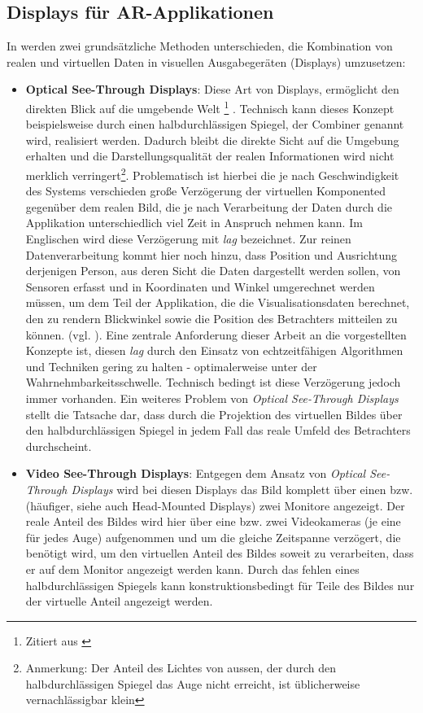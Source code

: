 \documentclass[a4paper,titlepage,12pt]{scrartcl}
\newtheorem[L]{boxedDefinition}{Definition}
\newcommand{\footnoteremember}[2]{
  \footnote{#2}
  \newcounter{#1}
  \setcounter{#1}{\value{footnote}}
}
\newcommand{\footnoterecall}[1]{
  \footnotemark[\value{#1}]
}
\begin{document}
\subsection{Displays für AR-Applikationen}
In \cite[Kapitel 2.2, Seite 21]{Toe2010} werden zwei grundsätzliche Methoden unterschieden, die Kombination von realen und virtuellen Daten in visuellen Ausgabegeräten (Displays) umzusetzen:
\begin{itemize}
 \item \textbf{Optical See-Through Displays}: Diese Art von Displays, ermöglicht den \glqq direkten Blick auf die umgebende Welt\grqq\footnoteremember{f:Toe2010-S21}{Zitiert aus \cite[Kapitel 2.2, Seite 21f.]{Toe2010}}. Technisch kann dieses Konzept beispielsweise durch einen halbdurchlässigen Spiegel, der Combiner genannt wird, realisiert werden. Dadurch bleibt die \glqq direkte Sicht auf die Umgebung\grqq\footnoterecall{f:Toe2010-S21} erhalten und die Darstellungsqualität der realen Informationen wird nicht merklich verringert\footnote{Anmerkung: Der Anteil des Lichtes von aussen, der durch den halbdurchlässigen Spiegel das Auge nicht erreicht, ist üblicherweise vernachlässigbar klein}. Problematisch ist hierbei die je nach Geschwindigkeit des Systems verschieden große Verzögerung der virtuellen Komponented gegenüber dem realen Bild, die je nach Verarbeitung der Daten durch die Applikation unterschiedlich viel Zeit in Anspruch nehmen kann. Im Englischen wird diese Verzögerung mit \textit{lag} bezeichnet. Zur reinen Datenverarbeitung kommt hier noch hinzu, dass Position und Ausrichtung derjenigen Person, aus deren Sicht die Daten dargestellt werden sollen, von Sensoren erfasst und in Koordinaten und Winkel umgerechnet werden müssen, um dem Teil der Applikation, die die Visualisationsdaten berechnet, den zu rendern Blickwinkel sowie die Position des Betrachters mitteilen zu können. (vgl. \cite[Kapitel 2.2, Seite 21f.]{Toe2010}). Eine zentrale Anforderung dieser Arbeit an die vorgestellten Konzepte ist, diesen \textit{lag} durch den Einsatz von echtzeitfähigen Algorithmen und Techniken gering zu halten - optimalerweise unter der Wahrnehmbarkeitsschwelle. Technisch bedingt ist diese Verzögerung jedoch immer vorhanden.
 Ein weiteres Problem von \textit{Optical See-Through Displays} stellt die Tatsache dar, dass durch die Projektion des virtuellen Bildes über den halbdurchlässigen Spiegel in jedem Fall das reale Umfeld des Betrachters durchscheint.
 \item \textbf{Video See-Through Displays}: Entgegen dem Ansatz von \textit{Optical See-Through Displays} wird bei diesen Displays das Bild komplett über einen bzw. (häufiger, siehe auch \glqq Head-Mounted Displays\grqq) zwei Monitore angezeigt. Der reale Anteil des Bildes wird hier über eine bzw. zwei Videokameras (je eine für jedes Auge) aufgenommen und um die gleiche Zeitspanne verzögert, die benötigt wird, um den virtuellen Anteil des Bildes soweit zu verarbeiten, dass er auf dem Monitor angezeigt werden kann. Durch das fehlen eines halbdurchlässigen Spiegels kann konstruktionsbedingt für Teile des Bildes nur der virtuelle Anteil angezeigt werden.

\end{itemize}
\end{document}
